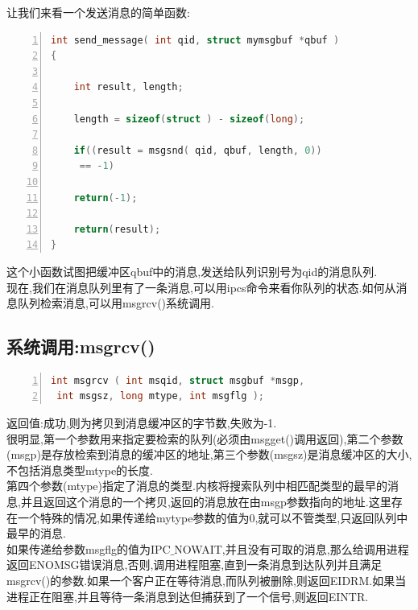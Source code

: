 \documentclass[a4paper,12pt,notitlepage]{article}
\begin{document}
	让我们来看一个发送消息的简单函数:

\begin{lstlisting}[frame=shadowbox,numbers=left,language=C]
int send_message( int qid, struct mymsgbuf *qbuf )
{

	int result, length;

	length = sizeof(struct ) - sizeof(long);       

	if((result = msgsnd( qid, qbuf, length, 0))
	 == -1)

	return(-1);

	return(result);
}
\end{lstlisting}

	这个小函数试图把缓冲区qbuf中的消息,发送给队列识别号为qid的消息队列.\\

	现在,我们在消息队列里有了一条消息,可以用ipcs命令来看你队列的状态.如何从消息队列检索消息,可以用msgrcv()系统调用.\\

\subsection{系统调用:msgrcv()}                                                 

\begin{lstlisting}[frame=shadowbox,numbers=left,language=C]
int msgrcv ( int msqid, struct msgbuf *msgp,
 int msgsz, long mtype, int msgflg );
\end{lstlisting}

   返回值:成功,则为拷贝到消息缓冲区的字节数,失败为-1.\\

	很明显,第一个参数用来指定要检索的队列(必须由msgget()调用返回),第二个参数(msgp)是存放检索到消息的缓冲区的地址,第三个参数(msgsz)是消息缓冲区的大小,不包括消息类型mtype的长度.\\

	第四个参数(mtype)指定了消息的类型.内核将搜索队列中相匹配类型的最早的消息,并且返回这个消息的一个拷贝,返回的消息放在由msgp参数指向的地址.这里存在一个特殊的情况,如果传递给mytype参数的值为0,就可以不管类型,只返回队列中最早的消息.\\

	如果传递给参数msgflg的值为IPC$\_$NOWAIT,并且没有可取的消息,那么给调用进程返回ENOMSG错误消息,否则,调用进程阻塞,直到一条消息到达队列并且满足msgrcv()的参数.如果一个客户正在等待消息,而队列被删除,则返回EIDRM.如果当进程正在阻塞,并且等待一条消息到达但捕获到了一个信号,则返回EINTR.\\
\end{document}
